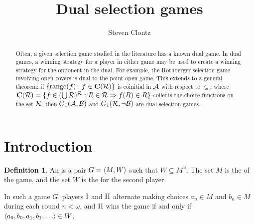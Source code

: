 \documentclass{amsart}
\theoremstyle{plain}
\theoremstyle{definition}
\newtheorem{definition}[theorem]{Definition}
\theoremstyle{remark}
\theoremstyle{plain}
\theoremstyle{definition}
\theoremstyle{remark}
\begin{document}
\title{Dual selection games}



\author{Steven Clontz}
\address{Department of Mathematics and Statistics,
The University of South Alabama,
Mobile, AL 36688}









\begin{abstract}
  Often, a given selection game studied in the literature has
  a known dual game. In dual games, a winning
  strategy for a player in either game may be used to create
  a winning strategy for the opponent in the dual. 
  For example, the Rothberger selection game involving open covers
  is dual to the point-open game. This extends to a general
  theorem: if \(\{\text{range}(f):f\in\mathbf C(\mathcal{R})\}\) is coinitial in \(\mathcal{A}\)
  with respect to \(\subseteq\),
  where \(\mathbf C(\mathcal{R})=\{f\in(\bigcup\mathcal{R})^{\mathcal{R}}:R\in\mathcal{R}\Rightarrow f(R)\in R\}\) 
  collects the choice functions on the set \(\mathcal{R}\),
  then \(G_1(\mathcal{A},\mathcal{B})\) and \(G_1(\mathcal{R},\neg\mathcal{B})\)
  are dual selection games. 
\end{abstract}


\maketitle







\section{Introduction}

\begin{definition}
  An  is a pair \(G=\langle M,W\rangle\) such that
  \(W\subseteq M^\omega\). The set \(M\) is the  of the game,
  and the set \(W\) is the  for the second player.
\end{definition}

In such a game \(G\), players \(\mathrm{I}\) and \(\mathrm{II}\) alternate making choices
\(a_n\in M\) and \(b_n\in M\) during each round \(n<\omega\), 
and \(\mathrm{II}\) wins the game if and only if \(\<a_0,b_0,a_1,b_1,\dots\>\in W\).
\end{document}
